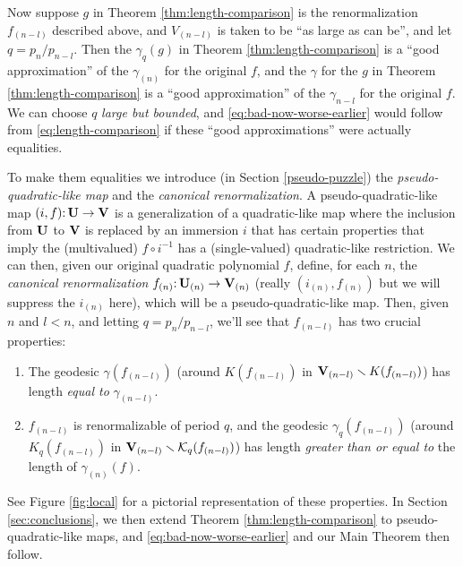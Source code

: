 Now suppose $g$ in Theorem \ref{thm:length-comparison} is the renormalization $f_{(n-l)}$ described above,
and $V_{(n-l)}$ is taken to be ``as large as can be'', 
and let $q = p_n/p_{n-l}$. 
Then the $\gamma_q(g)$ in Theorem \ref{thm:length-comparison} is a ``good approximation'' of the $\gamma_{(n)}$ for the original $f$,
and the $\gamma$ for  the $g$ in Theorem \ref{thm:length-comparison} is a ``good approximation'' of the $\gamma_{n-l}$ for the original $f$.
We can choose $q$ \emph{large but bounded},
and \eqref{eq:bad-now-worse-earlier} would follow from \eqref{eq:length-comparison} if these ``good approximations'' were actually equalities.

To make them equalities we introduce (in Section \ref{pseudo-puzzle}) the \emph{pseudo-quadratic-like map} and the \emph{canonical renormalization}.
A pseudo-quadratic-like map $(i, f)\mathpunct: 
\mathbf U \to {\mathbf{V}}$ 
is a generalization of a quadratic-like map 
where the inclusion from $\mathbf U$ to ${\mathbf{V}}$ is replaced by an immersion $i$ that has certain properties that imply the (multivalued) $f \circ i^{-1}$ has a (single-valued) quadratic-like restriction. 
We can then,
given our original quadratic polynomial $f$,
define, 
for each $n$,
the \emph{canonical renormalization} $f_{(n)}\mathpunct: \mathbf U_{(n)}\to {\mathbf{V}}_{(n)}$
(really $(i_{(n)}, f_{(n)})$ but we will suppress the $i_{(n)}$ here),
which will be a pseudo-quadratic-like map.
Then,
given $n$ and $l < n$,
and letting $q = p_n/p_{n-l}$,
we'll see that $f_{(n-l)}$ has two crucial properties:
\begin{enumerate}
\item
The geodesic $\gamma(f_{(n-l)})$ (around $K(f_{(n-l)})$ in ${\mathbf{V}}_{(n-l)} \smallsetminus K(f_{(n-l)})$) has length \emph{equal to} $\gamma_{(n-l)}$.
\item
$f_{(n-l)}$ is renormalizable of period $q$,
and the geodesic $\gamma_q(f_{(n-l)})$ 
(around $K_q(f_{(n-l)})$ in ${\mathbf{V}}_{(n-l)} \smallsetminus {\mathcal K}_q(f_{(n-l)})$) has length \emph{greater than or equal to} the length of $\gamma_{(n)}(f)$.  
\end{enumerate}
See Figure \ref{fig:local} for a pictorial representation of these properties.
In Section \ref{sec:conclusions},
we then extend Theorem \ref{thm:length-comparison} to pseudo-quadratic-like maps,
and \eqref{eq:bad-now-worse-earlier} and our Main Theorem then follow. 




